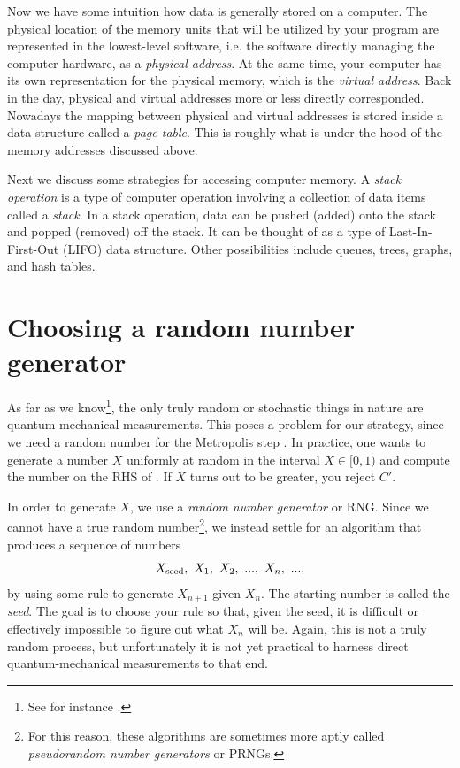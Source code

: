 Now we have some intuition how data is generally stored on a computer.
The physical location of the memory units that will be utilized by your
program are represented in the lowest-level software, i.e. the software
directly managing the computer hardware, as a {\it physical address}.
At the same time, your computer has its own representation for the physical
memory, which is the {\it virtual address}.
Back in the day, physical and virtual addresses more or less directly corresponded.
Nowadays the mapping between physical and virtual addresses is stored inside a
data structure called a {\it page table}.
This is roughly what is under the hood of the memory
addresses discussed above.

Next we discuss some strategies for accessing computer memory.
A {\it stack operation} is a type of computer operation involving a 
collection of data items called a {\it stack}. In a stack operation, data can be 
pushed (added) onto the stack and popped (removed) off the stack. It can be thought 
of as a type of Last-In-First-Out (LIFO) data structure.
Other possibilities include queues, trees, graphs, and hash tables.


\section{Choosing a random number generator}

As far as we know\footnote{See for instance .}, 
the only truly random or stochastic things in nature are
quantum mechanical measurements. This poses a problem for our strategy, since
we need a random number for the Metropolis step .
In practice, one wants to generate a number $X$ uniformly at random
in the interval $X\in[0,1)$ and compute the number on the RHS
of . If $X$ turns out to be greater, you reject $C'$.

In order to generate $X$, we use a {\it random number
generator} or RNG. 
Since we cannot have a true random number\footnote{For
this reason, these algorithms are sometimes more aptly called
{\it pseudorandom number generators}
or PRNGs.}, we instead settle for an algorithm that produces a sequence of numbers
\begin{equation}
  X_{\rm seed},~X_1,~X_2,~...,~X_n,~...,
\end{equation}
by using some rule to generate $X_{n+1}$ given $X_n$. The starting number is
called the {\it seed}. The goal is to choose your rule so that,
given the seed, it is difficult or effectively impossible to figure out what
$X_n$ will be. Again, this is not a truly random process, but unfortunately it
is not yet practical to harness direct quantum-mechanical measurements to that
end. 

